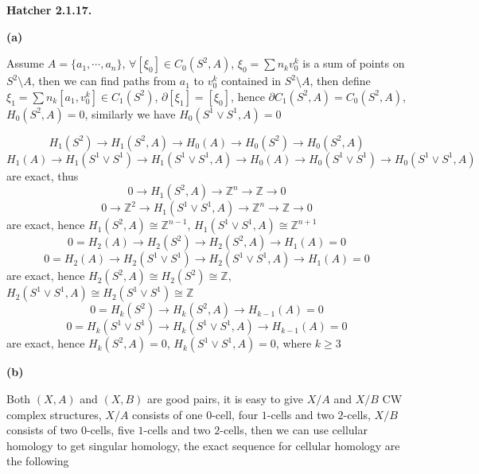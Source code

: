 \documentclass[../main.tex]{subfiles}
\begin{document}
\textbf{Hatcher 2.1.17.} \par
\textbf{(a)} \par
Assume $A=\{a_1,\cdots,a_n\}$, $\forall [\xi_0]\in C_0(S^2,A)$, $\xi_0=\sum n_kv_0^k$ is a sum of points on $S^2\setminus A$, then we can find paths from $a_1$ to $v_0^k$ contained in $S^2\setminus A$, then define $\xi_1=\sum n_k[a_1,v_0^k]\in C_1(S^2)$, $\partial[\xi_1]=[\xi_0]$, hence $\partial C_1(S^2,A)=C_0(S^2,A)$, $H_0(S^2,A)=0$, similarly we have $H_0(S^1\vee S^1,A)=0$ \par
\[H_1(S^2)\rightarrow H_1(S^2,A)\rightarrow H_0(A)\rightarrow H_0(S^2)\rightarrow H_0(S^2,A)\]
\[H_1(A)\rightarrow H_1(S^1\vee S^1)\rightarrow H_1(S^1\vee S^1,A)\rightarrow H_0(A)\rightarrow H_0(S^1\vee S^1)\rightarrow H_0(S^1\vee S^1,A)\]
are exact, thus
\[0\rightarrow H_1(S^2,A)\rightarrow \mathbb{Z}^n\rightarrow \mathbb{Z}\rightarrow 0\]
\[0\rightarrow \mathbb{Z}^2\rightarrow H_1(S^1\vee S^1,A)\rightarrow \mathbb{Z}^n\rightarrow \mathbb{Z}\rightarrow 0\]
are exact, hence $H_1(S^2,A)\cong\mathbb{Z}^{n-1}$, $H_1(S^1\vee S^1,A)\cong\mathbb{Z}^{n+1}$
\[0=H_2(A)\rightarrow H_2(S^2)\rightarrow H_2(S^2,A)\rightarrow H_1(A)=0\]
\[0=H_2(A)\rightarrow H_2(S^1\vee S^1)\rightarrow H_2(S^1\vee S^1,A)\rightarrow H_1(A)=0\]
are exact, hence $H_2(S^2,A)\cong H_2(S^2)\cong\mathbb{Z}$, $H_2(S^1\vee S^1,A)\cong H_2(S^1\vee S^1)\cong\mathbb{Z}$ 
\[0=H_k(S^2)\rightarrow H_k(S^2,A)\rightarrow H_{k-1}(A)=0\]
\[0=H_k(S^1\vee S^1)\rightarrow H_k(S^1\vee S^1,A)\rightarrow H_{k-1}(A)=0\]
are exact, hence $H_k(S^2,A)=0$, $H_k(S^1\vee S^1,A)=0$, where $k\geq 3$ \par
\textbf{(b)} \par
Both $(X,A)$ and $(X,B)$ are good pairs,  it is easy to give $X/A$ and $X/B$ CW complex structures, $X/A$ consists of one $0$-cell, four $1$-cells and two $2$-cells, $X/B$ consists of two $0$-cells, five $1$-cells and two $2$-cells, then we can use cellular homology to get singular homology, the exact sequence for cellular homology are the following \par
\begin{center}
\end{center}
\par
\begin{center}
\end{center}
\end{document}
